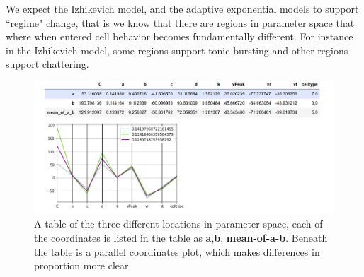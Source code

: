 
We expect the Izhikevich model, and the adaptive exponential models to support ``regime" change, that is we know that there are regions in parameter space that where when entered cell behavior becomes fundamentally different. For instance in the Izhikevich model, some regions support tonic-bursting and other regions support chattering. 

\begin{figure}
    \centering
    \includegraphics{figures/mean_model_mean_measure_ment_params.png}
    \caption[sets of coordinates that describe three different points in parameters space]{A table of the three different locations in parameter space, each of the coordinates is listed in the table as \textbf{a},\textbf{b}, \textbf{mean-of-a-b}. Beneath the table is a parallel coordinates plot, which makes differences in proportion more clear}
    \label{fig:my_label}
\end{figure}


